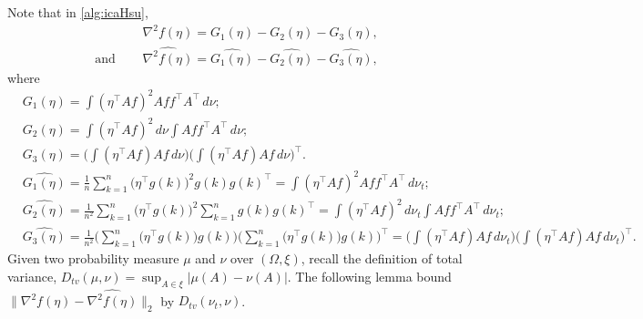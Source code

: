 \documentclass[english]{article} %
\theoremstyle{definition}
\begin{document}
Note that in \cref{alg:icaHsu}, 
\begin{align*}
& \nabla^2 f(\eta) = G_1(\eta) - G_2(\eta) -G_3(\eta), \\
\text{and } \quad & \widehat{\nabla^2 f(\eta)} =\widehat{G_1(\eta)} - \widehat{G_2(\eta)} -\widehat{G_3(\eta)},
\end{align*}
where 
\begin{align*}
& G_1(\eta) = \int (\eta^{\top}Af)^2Aff^{\top}A^{\top}\,d\nu; \\
& G_2(\eta) = \int (\eta^{\top}Af)^2\,d\nu \int Aff^{\top}A^{\top} \,d\nu; \\
& G_3(\eta) = \Big(\int (\eta^{\top}Af)Af\,d\nu\Big)\Big(\int (\eta^{\top}Af)Af\,d\nu\Big)^{\top}. \\
&\widehat{ G_1(\eta)} = \frac1n\sum_{k=1}^{n} \big(\eta^{\top}g(k)\big)^2g(k)g(k)^{\top} = \int (\eta^{\top}Af)^2Aff^{\top}A^{\top}\,d\nu_t; \\
& \widehat{G_2(\eta)} = \frac{1}{n^2}\sum_{k=1}^{n} \big(\eta^{\top}g(k)\big)^2 \sum_{k=1}^{n}g(k)g(k)^{\top} = \int (\eta^{\top}Af)^2\,d\nu_t \int Aff^{\top}A^{\top} \,d\nu_t; \\
& \widehat{G_3(\eta)} = \frac{1}{n^2}\Big(\sum_{k=1}^{n} \big(\eta^{\top}g(k)\big)g(k)\Big) \Big(\sum_{k=1}^{n} \big(\eta^{\top}g(k)\big)g(k)\Big)^{\top} = \Big(\int (\eta^{\top}Af)Af\,d\nu_t\Big)\Big(\int (\eta^{\top}Af)Af\,d\nu_t\Big)^{\top}.
\end{align*}
Given two probability measure $\mu$ and $\nu$ over $(\Omega , \xi)$, recall the definition of total variance, $D_{tv}(\mu, \nu) = \sup_{A\in\xi} |\mu(A) - \nu(A)|$. 
The following lemma bound $\|\nabla^2 f(\eta) - \widehat{\nabla^2 f(\eta)} \|_2$ by $D_{tv}(\nu_t , \nu)$.
\end{document}
